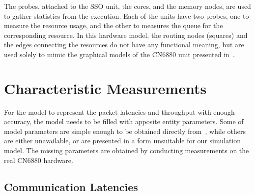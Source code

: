 The probes, attached to the SSO unit, the cores, and the memory nodes, are used to gather statistics from the execution. Each of the units have two probes, one to measure the resource usage, and the other to measures the queue for the corresponding resource. In this hardware model, the routing nodes (squares) and the edges connecting the resources do not have any functional meaning, but are used solely to mimic the graphical models of the CN6880 unit presented in~\cite{cavium:2010:fundamentals}.

\section{Characteristic Measurements}
\label{sec:characteristic-measurements}

For the model to represent the packet latencies and throughput with enough accuracy, the model needs to be filled with apposite entity parameters. Some of model parameters are simple enough to be obtained directly from~\cite{cavium:2010:fundamentals}, while others are either unavailable, or are presented in a form unsuitable for our simulation model. The missing parameters are obtained by conducting measurements on the real CN6880 hardware.




\subsection{Communication Latencies}
\label{sec:communication-latencies}

